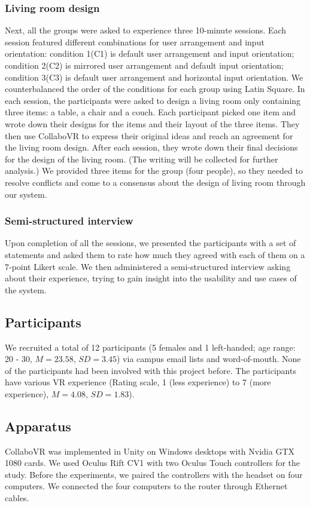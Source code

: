 \documentclass{sigchi}
\begin{document}
\subsubsection{Living room design}
Next, all the groups were asked to experience three 10-minute sessions. 
Each session featured different combinations for user arrangement and input orientation: condition 1(C1) is default user arrangement and input orientation; condition 2(C2) is mirrored user arrangement and default input orientation; condition 3(C3) is default user arrangement and horizontal input orientation.
We counterbalanced the order of the conditions for each group using Latin Square. In each session, the participants were asked to design a living room only containing three items: a table, a chair and a couch. 
Each participant picked one item and wrote down their designs for the items and their layout of the three items. They then use CollaboVR to express their original ideas and reach an agreement for the living room design. After each session, they wrote down their final decisions for the design of the living room. (The writing will be collected for further analysis.)
We provided three items for the group (four people), so they needed to resolve conflicts and come to a consensus about the design of living room through our system.

\subsubsection{Semi-structured interview}
Upon completion of all the sessions, we presented the participants with a set of statements and asked them to rate how much they agreed with each of them on a 7-point Likert scale. We then administered a semi-structured interview asking about their experience, trying to gain insight into the usability and use cases of the system.

\subsection{Participants}
We recruited a total of 12 participants (5 females and 1 left-handed; age range: 20 - 30, $M=23.58$, $SD=3.45$) via campus email lists and word-of-mouth. None of the participants had been involved with this project before. The participants have various VR experience (Rating scale, 1 (less experience) to 7 (more experience), $M=4.08$, $SD=1.83$).

\subsection{Apparatus}
CollaboVR was implemented in Unity on Windows desktops with Nvidia GTX 1080 cards. We used Oculus Rift CV1 with two Oculus Touch controllers for the study. Before the experiments, we paired the controllers with the headset on four computers. We connected the four computers to the router through Ethernet cables.
\end{document}
